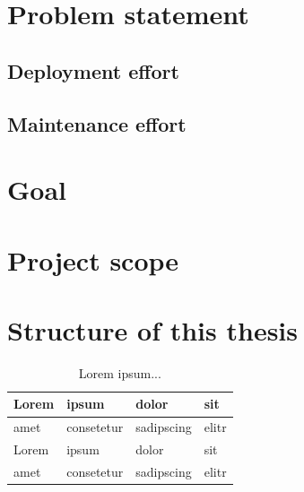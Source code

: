 \section{Problem statement}
\subsection{Deployment effort}

\subsection{Maintenance effort}
\section{Goal}
\section{Project scope}
\section{Structure of this thesis}



\begin{table}[!ht]
	\small
	\centering
	\begin{tabular}{|l|l|l|l|}
		\hline
		Lorem & ipsum & dolor & sit \\
		\hline
		amet & consetetur & sadipscing & elitr \\
		\hline
		Lorem & ipsum & dolor & sit \\
		\hline
		amet & consetetur & sadipscing & elitr \\
		\hline
	\end{tabular}
	\caption{Lorem ipsum...}
\end{table}




